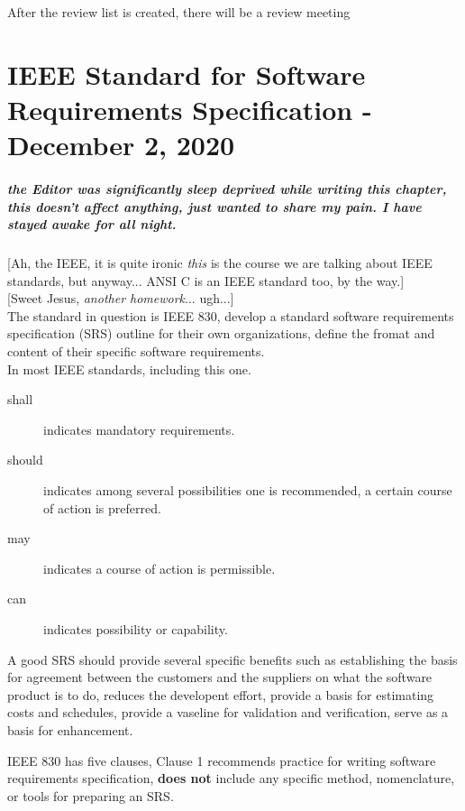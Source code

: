 \documentclass[11pt,a4paper,twocolumn]{book}
\begin{document}
After the review list is created, there will be a review meeting

\chapter{IEEE Standard for Software Requirements Specification - December 2, 2020}

\paragraph{the Editor was significantly sleep deprived while writing this chapter, this doesn't affect anything, just wanted to share my pain. I have stayed awake for all night.}

[Ah, the IEEE, it is quite ironic \textit{this} is the course we are talking about IEEE standards, but anyway... ANSI C is an IEEE standard too, by the way.]\\

[Sweet Jesus, \textit{another homework}... ugh...]\\

The standard in question is IEEE 830, develop a standard software requirements specification (SRS) outline for their own organizations, define the fromat and content of their specific software requirements.\\

In most IEEE standards, including this one.

\begin{description}
\item[shall] indicates mandatory requirements.
\item[should] indicates among several possibilities one is recommended, a certain course of action is preferred.
\item[may] indicates a course of action is permissible.
\item[can] indicates possibility or capability.
\end{description}

A good SRS should provide several specific benefits such as establishing the basis for agreement between the customers and the suppliers on what the software product is to do, reduces the developent effort, provide a basis for estimating costs and schedules, provide a vaseline for validation and verification, serve as a basis for enhancement.

IEEE 830 has five clauses, Clause 1 recommends practice for writing software requirements specification, \textbf{does not} include any specific method, nomenclature, or tools for preparing an SRS.\\
\end{document}
